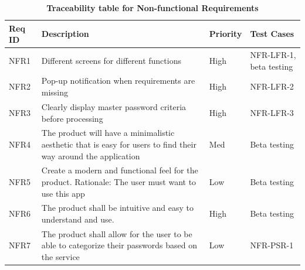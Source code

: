 \documentclass[12pt, titlepage]{article}
\begin{document}
\begin{table}[!htbp]
    \caption{\textbf{Traceability table for Non-functional Requirements}} \label{Table}
    \small
    \begin{tabularx}{\textwidth}{p{2cm}Xp{2cm}X}
        \toprule
        \textbf{Req ID} & \textbf{Description} & \textbf{Priority} & \textbf{Test Cases}\\
        \midrule
        
        NFR1  & Different screens for different functions & High & NFR-LFR-1, beta testing\\\hline
        NFR2  & Pop-up notification when requirements are missing & High & NFR-LFR-2\\\hline
        NFR3  & Clearly display master password criteria before processing & High & NFR-LFR-3\\\hline      
        NFR4  & The product will have a minimalistic aesthetic that is easy for users to find their way around the application & Med & Beta testing\\\hline
        NFR5  & Create a modern and functional feel for the product. Rationale: The user must want to use this app & Low & Beta testing\\\hline
        NFR6  & The product shall be intuitive and easy to understand and use. & High & Beta testing\\\hline
        NFR7  & The product shall allow for the user to be able to categorize their passwords based on the service & Low & NFR-PSR-1\\\hline
        
        \midrule 
    \end{tabularx}
\end{table}
\end{document}
